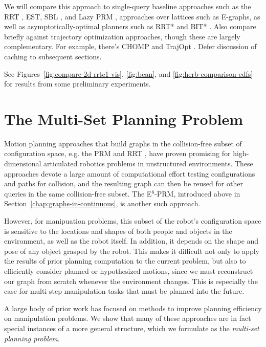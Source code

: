 We will compare this approach to
single-query baseline approaches
such as the RRT \citep{kuffner2000rrtconnect},
EST, SBL \citep{sanchezante2001sbl},
and Lazy PRM \citep{bohlin2000lazyprm},
approaches over lattices such as E-graphs,
as well as asymptotically-optimal planners such as
RRT* \citep{karaman2011samplingoptimal}
and BIT* \citep{gammell2015bitstar}.
Also compare briefly against trajectory optimization approaches,
though these are largely complementary.
For example, there's CHOMP \citep{zucker2013chomp}
and TrajOpt \citep{schulman2013trajopt}.
Defer discussion of caching to subsequent
sections.

See Figures~\ref{fig:compare-2d-rrtc1-vis},
\ref{fig:bean}, and \ref{fig:herb-comparison-cdfs}
for results from some preliminary experiments.

\section{The Multi-Set Planning Problem}
\label{chap:multi-set}

Motion planning approaches that build graphs
in the collision-free subset of
configuration space,
e.g. the
PRM \citep{kavrakietal1996prm}
and RRT \citep{lavallekuffner1999rrt},
have proven promising
for high-dimensional articulated robotics problems
in unstructured environments.
These approaches devote a large amount of computational effort
testing configurations and paths for collision,
and the resulting graph can then be reused
for other queries in the same collision-free subset.
The E$^8$-PRM,
introduced above in Section~\ref{chap:graphs-in-continuous},
is another such approach.

However,
for manipuation problems,
this subset of the robot's configuration space
is sensitive to the locations and shapes of
both people and objects in the environment,
as well as the robot itself.
In addition, it depends on the shape and pose of any object
grasped by the robot.
This makes it difficult not only to apply the results of prior
planning computation to the current problem,
but also to efficiently consider planned or hypothesized motions,
since we must reconstruct our graph from scratch whenever
the environment changes.
This is especially the case for
multi-step manipulation tasks that must be planned into the future.

A large body of prior work has focused on methods to
improve planning efficiency on manipulation problems.
We show that many of these approaches are
in fact special instances of a more general structure,
which we formulate as the \emph{multi-set planning problem}.

